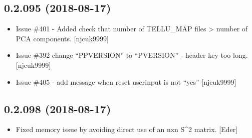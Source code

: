 \documentclass[a4paper,10pt,english]{report}
\begin{document}
\subsection{0.2.095 (2018-08-17)}
\label{\detokenize{misc/changelog:id363}}\begin{itemize}
\item {} 
Issue \#401 - Added check that number of TELLU\_MAP files \textgreater{} number of
PCA components. {[}njcuk9999{]}

\item {} 
Issue \#392 change “PPVERSION” to “PVERSION” - header key too long.
{[}njcuk9999{]}

\item {} 
Issue \#405 - add message when reset userinput is not “yes” {[}njcuk9999{]}

\end{itemize}


\subsection{0.2.098 (2018-08-17)}
\label{\detokenize{misc/changelog:id364}}\begin{itemize}
\item {} 
Fixed memory issue by avoiding direct use of an nxn S\textasciicircum{}2 matrix. {[}Eder{]}

\end{itemize}
\end{document}
